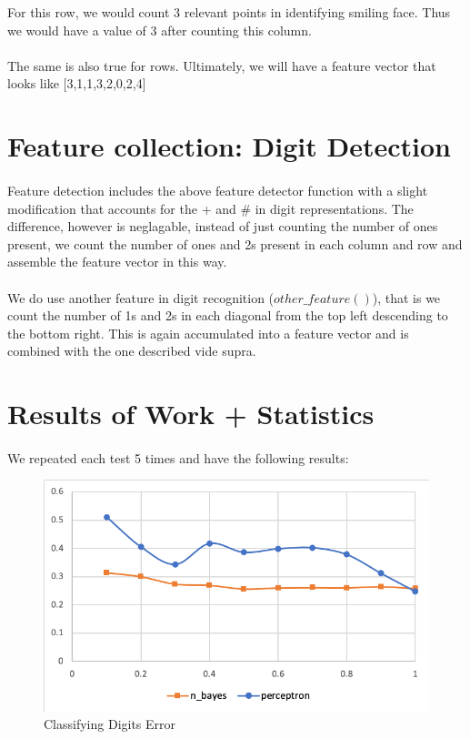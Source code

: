\documentclass{article}
\begin{document}
For this row, we would count 3 relevant points in identifying smiling face. Thus we would have a value of 3 after counting this column. \\
\\
The same is also true for rows. 
Ultimately, we will have a feature vector that looks like [3,1,1,3,2,0,2,4]


\section*{Feature collection: Digit Detection}
\paragraph*{}
Feature detection includes the above feature detector function with a slight modification that accounts for the + and \# in digit representations. The difference, however is neglagable, instead of just counting the number of ones present, we count the number of ones and 2s present in each column and row and assemble the feature vector in this way. \\
\\
We do use another feature in digit recognition ($other\_feature()$), that is we count the number of 1s and 2s in each diagonal from the top left descending to the bottom right. This is again accumulated into a feature vector and is combined with the one described vide supra. 


\section*{Results of Work + Statistics}
\paragraph*{}
We repeated each test 5 times and have the following results:

\begin{figure}
\includegraphics[width = 1\textwidth]{digit_error.png}
\caption{Classifying Digits Error}
\label{digit_error}
\end{figure}
\end{document}
